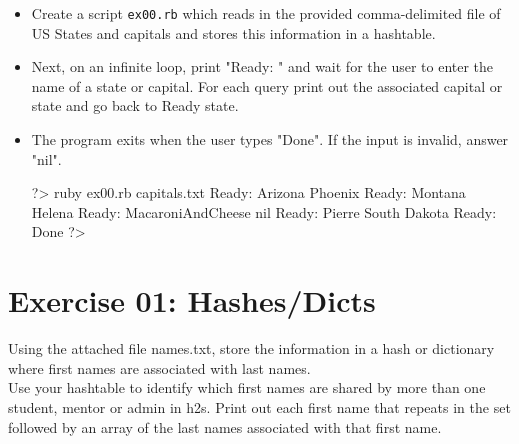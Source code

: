 \documentclass{42-en}
\begin{document}
\begin{itemize}

\item Create a script \texttt{ex00.rb} which reads in the provided comma-delimited file of US States and capitals and stores this information in a hashtable.
\item Next, on an infinite loop, print "Ready: " and wait for the user to enter the name of a state or capital. For each query print out the associated capital or state and go back to Ready state.
\item The program exits when the user types "Done". If the input is invalid, answer "nil".

\begin{42console}
	?> ruby ex00.rb capitals.txt
	Ready: Arizona
	Phoenix
	Ready: Montana
	Helena
	Ready: MacaroniAndCheese
	nil
	Ready: Pierre
	South Dakota
	Ready: Done
	?>
\end{42console}

\end{itemize}



\chapter{Exercise 01: Hashes/Dicts}

\makeheaderfiles

Using the attached file names.txt, store the information in a hash or dictionary where first names are associated with last names.\\

Use your hashtable to identify which first names are shared by more than one student, mentor or admin in h2s. Print out each first name that repeats in the set followed by an array of the last names associated with that first name.
\end{document}
